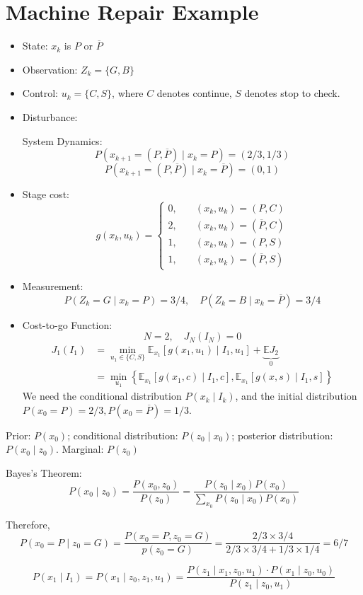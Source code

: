 \section{Machine Repair 
Example}
\begin{itemize}
\item
State: $x_k$ is $P$ or $\overline{P}$
\item
Observation: $Z_k = \{G,B\}$
\item
Control: $u_k = \{C,S\}$, where $C$ denotes continue, $S$ denotes stop to check.
\item
Disturbance:

System Dynamics:
\[
P(x_{k+1}=(P,\overline{P})\mid x_k=P)=(2/3,1/3)
\]
\[
P(x_{k+1} = (P,\overline{P})\mid x_k=\overline{P})=(0,1)
\]
\item
Stage cost:
\[
g(x_k,u_k) = \left\{
\begin{aligned}
0,&\quad(x_k,u_k)=(P,C)\\
2,&\quad(x_k,u_k)=(\overline{P},C)\\
1,&\quad(x_k,u_k) = (P,S)\\
1,&\quad(x_k,u_k)=(\overline{P},S)
\end{aligned}
\right.
\]
\item
Measurement:
\[
P(Z_k=G\mid x_k=P)=3/4,\quad
P(Z_k=B\mid x_k=\overline{P})=3/4
\]
\item
Cost-to-go Function:
\[
N=2,\quad
J_N(I_N)=0
\]
\begin{align*}
J_1(I_1) &= \min_{u_1\in\{C,S\}}\mathbb{E}_{x_1}[g(x_1,u_1)\mid I_1,u_1]+\underbrace{\mathbb{E}J_2}_{0}\\
&=
\min_{u_1}\left\{
\mathbb{E}_{x_1}[g(x_1,c)\mid I_1,c]
,
\mathbb{E}_{x_1}[g(x,s)\mid I_1,s]
\right\}
\end{align*}
We need the conditional distribution $P(x_k\mid I_k)$, and the initial distribution $P(x_0=P)=2/3,P(x_0=\overline{P})=1/3$.
\end{itemize}
Prior: $P(x_0)$; conditional distribution: $P(z_0\mid x_0)$; posterior distribution: $P(x_0\mid z_0)$. Marginal: $P(z_0)$

Bayes's Theorem:
\[
P(x_0\mid z_0) = \frac{P(x_0,z_0)}{P(z_0)}
=
\frac{P(z_0\mid x_0)P(x_0)}{\sum_{x_0}P(z_0\mid x_0)P(x_0)}
\]

Therefore,
\[
P(x_0=P\mid z_0=G) = \frac{P(x_0=P,z_0=G)}{p(z_0=G)}
=
\frac{2/3\times 3/4}{2/3\times 3/4+1/3\times1/4}=6/7
\]

\[
P(x_1\mid I_1)
=P(x_1\mid z_0,z_1,u_1)
=
\frac{P(z_1\mid x_1,z_0,u_1)\cdot P(x_1\mid z_0,u_0)}{P(z_1\mid z_0,u_1)}
\]

















